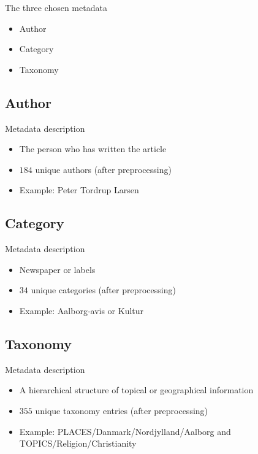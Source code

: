 \begin{frame}{\insertsection}{The three chosen metadata}
	\begin{itemize}
		\item Author
		\item Category
		\item Taxonomy
	\end{itemize}
\end{frame}

\subsection{Author}

\begin{frame}{\insertsubsection}{Metadata description}
	\begin{itemize}
		\item The person who has written the article
		\item $184$ unique authors (after preprocessing)
		\item Example: Peter Tordrup Larsen
	\end{itemize}
\end{frame}


\subsection{Category}

\begin{frame}{\insertsubsection}{Metadata description}
	\begin{itemize}
		\item Newspaper or labels
		\item $34$ unique categories (after preprocessing)
		\item Example: Aalborg-avis or Kultur
	\end{itemize}
\end{frame}


\subsection{Taxonomy}

\begin{frame}{\insertsubsection}{Metadata description}
	\begin{itemize}
		\item A hierarchical structure of topical or geographical information 
		\item $355$ unique taxonomy entries (after preprocessing)
		\item Example: PLACES/Danmark/Nordjylland/Aalborg and TOPICS/Religion/Christianity
	\end{itemize}
\end{frame}

